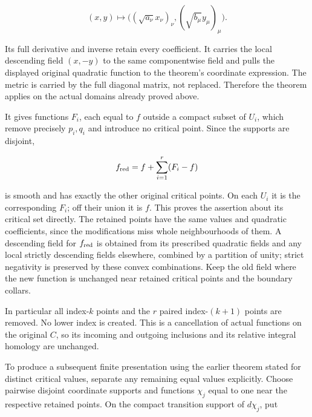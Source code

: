 \begin{equation}
(x,y)\longmapsto
 \bigl((\sqrt{a_\nu}x_\nu)_\nu,
       (\sqrt{b_\mu}y_\mu)_\mu\bigr).
 \label{courseIII:realizing-framed-handles-and-middle-cancellation:eq:5.4}
\end{equation}

Its full derivative and inverse retain every coefficient. It carries the local descending field \((x,-y)\) to the same componentwise field and pulls the displayed original quadratic function to the theorem's coordinate expression. The metric is carried by the full diagonal matrix, not replaced. Therefore the theorem applies on the actual domains already proved above.

It gives functions \(F_i\), each equal to \(f\) outside a compact subset of \(U_i\), which remove precisely \(p_i,q_i\) and introduce no critical point. Since the supports are disjoint,

\begin{equation}
f_{\rm red}=f+\sum_{i=1}^r(F_i-f)
 \label{courseIII:realizing-framed-handles-and-middle-cancellation:eq:5.5}
\end{equation}

is smooth and has exactly the other original critical points. On each \(U_i\) it is the corresponding \(F_i\); off their union it is \(f\). This proves the assertion about its critical set directly. The retained points have the same values and quadratic coefficients, since the modifications miss whole neighbourhoods of them. A descending field for \(f_{\rm red}\) is obtained from its prescribed quadratic fields and any local strictly descending fields elsewhere, combined by a partition of unity; strict negativity is preserved by these convex combinations. Keep the old field where the new function is unchanged near retained critical points and the boundary collars.

In particular all index-\(k\) points and the \(r\) paired index-\((k+1)\) points are removed. No lower index is created. This is a cancellation of actual functions on the original \(C\), so its incoming and outgoing inclusions and its relative integral homology are unchanged.

To produce a subsequent finite presentation using the earlier theorem stated for distinct critical values, separate any remaining equal values explicitly. Choose pairwise disjoint coordinate supports and functions \(\chi_j\) equal to one near the respective retained points. On the compact transition support of \(d\chi_j\), put

